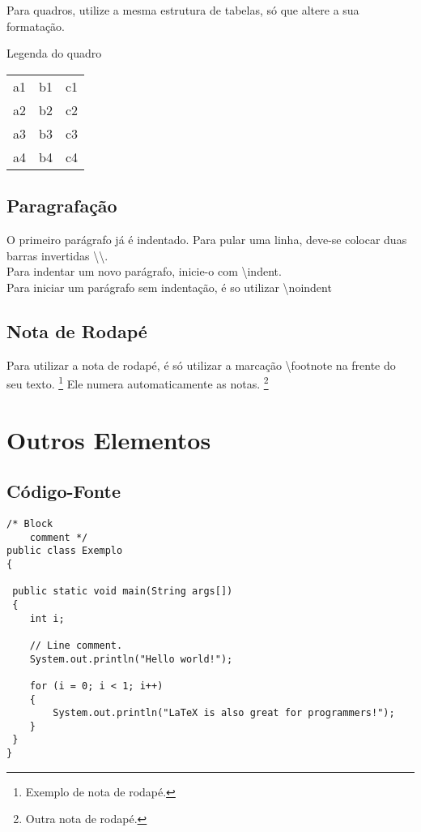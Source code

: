 \documentclass[12pt,openright,oneside,a4paper,english,french,spanish,brazil]{unifil}
\begin{document}
Para quadros, utilize a mesma estrutura de tabelas, só que altere a sua formatação.
\begin{quadro}[htb]
\caption{\label{quadro_modelo}Legenda do quadro}
\begin{tabular}{ c c c }
a1 & b1 & c1 \\ 
a2 & b2 & c2 \\ 
a3 & b3 & c3 \\ 
a4 & b4 & c4 \\ 
\end{tabular}
\end{quadro}

\section{Paragrafação}
O primeiro parágrafo já é indentado. Para pular uma linha, deve-se colocar duas barras invertidas \textbackslash \textbackslash. \\
\indent Para indentar um novo parágrafo, inicie-o com \textbackslash indent.\\
\noindent Para iniciar um parágrafo sem indentação, é so utilizar \textbackslash noindent

\section{Nota de Rodapé}
Para utilizar a nota de rodapé, é só utilizar a marcação \textbackslash footnote na frente do seu texto. \footnote{Exemplo de nota de rodapé.} Ele numera automaticamente as notas. \footnote{Outra nota de rodapé.}

\chapter{Outros Elementos}

\section{Código-Fonte}
\begin{lstlisting}
/* Block
    comment */
public class Exemplo
{

 public static void main(String args[])
 {
    int i;
 
    // Line comment.
    System.out.println("Hello world!");
 
    for (i = 0; i < 1; i++)
    {
        System.out.println("LaTeX is also great for programmers!");
    }
 }
}
\end{lstlisting}
\end{document}
